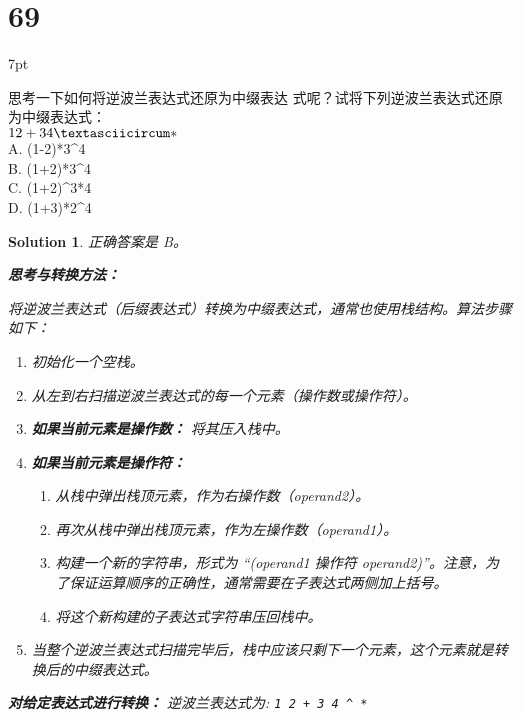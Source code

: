 \documentclass[UTF8]{report}
\newtheorem{solution}{Solution}
\theoremstyle{MyLineTheoremStyle} %
\theoremstyle{MyBlockTheoremStyle} %
\theoremstyle{MySubsubsectionStyle} %
\newenvironment{graybox}{%
        \def\FrameCommand{%
        \hspace{1pt}%
        {\color{gray}\small \vrule width 2pt}%
        {\color{graybox_color}\vrule width 4pt}%
        \colorbox{graybox_color}%
        }%
        \MakeFramed{\advance\hsize-\width\FrameRestore}%
        \noindent\hspace{-4.55pt}%
        \begin{adjustwidth}{}{7pt}%
        \vspace{2pt}\vspace{2pt}%
        }
        {%
        \vspace{2pt}\end{adjustwidth}\endMakeFramed%
        }
\begin{document}
\section*{69}
\begin{graybox}
思考一下如何将逆波兰表达式还原为中缀表达
式呢？试将下列逆波兰表达式还原为中缀表达式：\\
$1 2 + 3 4 \textasciicircum * $ \\
A. (1-2)*3\textasciicircum4 \\
B. (1+2)*3\textasciicircum4 \\
C. (1+2)\textasciicircum3*4 \\
D. (1+3)*2\textasciicircum4
\end{graybox}

\begin{solution}
正确答案是 B。

\textbf{思考与转换方法：}

将逆波兰表达式（后缀表达式）转换为中缀表达式，通常也使用栈结构。算法步骤如下：
\begin{enumerate}
    \item 初始化一个空栈。
    \item 从左到右扫描逆波兰表达式的每一个元素（操作数或操作符）。
    \item \textbf{如果当前元素是操作数：} 将其压入栈中。
    \item \textbf{如果当前元素是操作符：}
        \begin{enumerate}
            \item 从栈中弹出栈顶元素，作为右操作数（operand2）。
            \item 再次从栈中弹出栈顶元素，作为左操作数（operand1）。
            \item 构建一个新的字符串，形式为 ``(operand1 操作符 operand2)''。注意，为了保证运算顺序的正确性，通常需要在子表达式两侧加上括号。
            \item 将这个新构建的子表达式字符串压回栈中。
        \end{enumerate}
    \item 当整个逆波兰表达式扫描完毕后，栈中应该只剩下一个元素，这个元素就是转换后的中缀表达式。
\end{enumerate}

\textbf{对给定表达式进行转换：}
逆波兰表达式为: \texttt{1 2 + 3 4 \textasciicircum\ *}


\end{solution}
\end{document}
